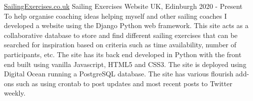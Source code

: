 \cventry
{\href{www.sailingexercises.co.uk}{SailingExercises.co.uk}}
{Sailing Exercises Website}
{UK, Edinburgh}
{2020 - Present}
{
    To help organise coaching ideas helping myself and other sailing coaches 
    I developed a website using the Django Python web framework. This site 
    acts as a collaborative database to store and find different sailing 
    exercises that can be searched for inspiration based on criteria such as 
    time availability, number of participants, etc. The site has its back end 
    developed in Python with the front end built using vanilla Javascript, 
    HTML5 and CSS3. The site is deployed using Digital Ocean running a 
    PostgreSQL database. The site has various flourish add-ons such as using 
    crontab to post updates and most recent posts to Twitter weekly.\newline
}
